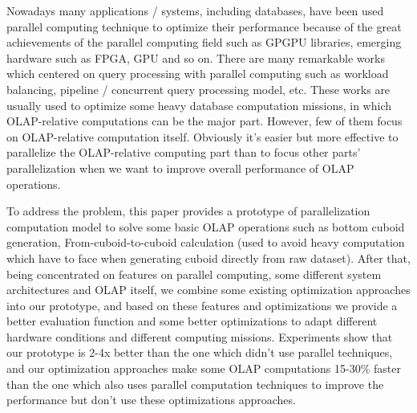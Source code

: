 \begin{enabstract}
Nowadays many applications / systems, including databases, have been used parallel computing technique to optimize their performance because of the great achievements of the parallel computing field such as GPGPU libraries, emerging hardware such as FPGA, GPU and so on. There are many remarkable works which centered on query processing with parallel computing such as workload balancing, pipeline / concurrent query processing model, etc. These works are usually used to optimize some heavy database computation missions, in which OLAP-relative computations can be the major part. However, few of them focus on OLAP-relative computation itself. Obviously it's easier but more effective to parallelize the OLAP-relative computing part than to focus other parts' parallelization when we want to improve overall performance of OLAP operations.

To address the problem, this paper provides a prototype of parallelization computation model to solve some basic OLAP operations such as bottom cuboid generation, From-cuboid-to-cuboid calculation (used to avoid heavy computation which have to face when generating cuboid directly from raw dataset). After that, being concentrated on features on parallel computing, some different system architectures and OLAP itself, we combine some existing optimization approaches into our prototype, and based on these features and optimizations we provide a better evaluation function and some better optimizations to adapt different hardware conditions and different computing missions. Experiments show that our prototype is 2-4x better than the one which didn't use parallel techniques, and our optimization approaches make some OLAP computations 15-30\% faster than the one which also uses parallel computation techniques to improve the performance but don't use these optimizations approaches.

\end{enabstract}
